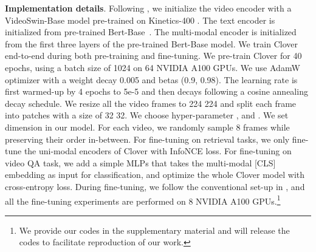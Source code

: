 \documentclass[10pt,twocolumn,letterpaper]{article}
\begin{document}
{\noindent  \textbf{Implementation details}.
\label{sec:implementation details}
Following \cite{fu2021violet}, we initialize the video encoder with a VideoSwin-Base \cite{liu2022video} model pre-trained on Kinetics-400 \cite{kay2017kinetics}. The text encoder is initialized from pre-trained Bert-Base~\cite{devlin2019bert}. The multi-modal encoder is initialized from the first three layers of the pre-trained Bert-Base model. We train Clover end-to-end   during both pre-training and fine-tuning. We pre-train Clover for 40 epochs, using a batch size of 1024 on 64 NVIDIA A100 GPUs. We use AdamW \cite{loshchilov2018decoupled} optimizer with a weight decay 0.005 and betas (0.9, 0.98). The learning rate is first warmed-up by 4 epochs to 5e-5 and then decays following a cosine annealing decay schedule. We resize all the video frames to 224  224 and split each frame into patches with a size of 32  32. We choose hyper-parameter ,  and . We set dimension  in our model. For each video, we randomly sample 8 frames while preserving their order in-between. For fine-tuning on retrieval tasks, we only fine-tune the uni-modal encoders of Clover with InfoNCE \cite{van2018representation} loss. For fine-tuning on video QA task, we add a simple MLPs that takes the multi-modal [CLS] embedding as input for classification, and optimize the whole Clover model with cross-entropy loss. During fine-tuning, we follow the conventional set-up in \cite{fu2021violet,luo2021clip4clip}, and all the fine-tuning experiments are performed on 8 NVIDIA A100 GPUs.\footnote{We provide our codes in the supplementary material and will release the codes to facilitate reproduction of our work.}




}
\end{document}
